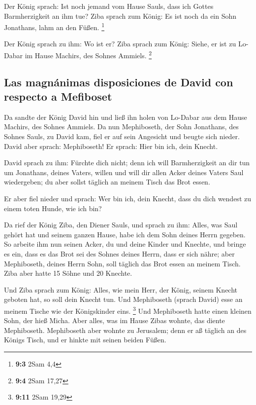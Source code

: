  Der König sprach: Ist noch jemand vom Hause Sauls, dass
ich Gottes Barmherzigkeit an ihm tue? Ziba sprach zum König: Es ist noch
da ein Sohn Jonathans, lahm an den Füßen. \footnote{\textbf{9:3} 2Sam
  4,4}

 Der König sprach zu ihm: Wo ist er? Ziba sprach zum
König: Siehe, er ist zu Lo-Dabar im Hause Machirs, des Sohnes Ammiels.
\footnote{\textbf{9:4} 2Sam 17,27}

\hypertarget{las-magnuxe1nimas-disposiciones-de-david-con-respecto-a-mefiboset}{%
\subsection{Las magnánimas disposiciones de David con respecto a
Mefiboset}\label{las-magnuxe1nimas-disposiciones-de-david-con-respecto-a-mefiboset}}

 Da sandte der König David hin und ließ ihn holen von
Lo-Dabar aus dem Hause Machirs, des Sohnes Ammiels.  Da
nun Mephiboseth, der Sohn Jonathans, des Sohnes Sauls, zu David kam,
fiel er auf sein Angesicht und beugte sich nieder. David aber sprach:
Mephiboseth! Er sprach: Hier bin ich, dein Knecht.

 David sprach zu ihm: Fürchte dich nicht; denn ich will
Barmherzigkeit an dir tun um Jonathans, deines Vaters, willen und will
dir allen Acker deines Vaters Saul wiedergeben; du aber sollst täglich
an meinem Tisch das Brot essen.

 Er aber fiel nieder und sprach: Wer bin ich, dein Knecht,
dass du dich wendest zu einem toten Hunde, wie ich bin?

 Da rief der König Ziba, den Diener Sauls, und sprach zu
ihm: Alles, was Saul gehört hat und seinem ganzen Hause, habe ich dem
Sohn deines Herrn gegeben.  So arbeite ihm nun seinen
Acker, du und deine Kinder und Knechte, und bringe es ein, dass es das
Brot sei des Sohnes deines Herrn, dass er sich nähre; aber Mephiboseth,
deines Herrn Sohn, soll täglich das Brot essen an meinem Tisch. Ziba
aber hatte 15 Söhne und 20 Knechte.

 Und Ziba sprach zum König: Alles, wie mein Herr, der
König, seinem Knecht geboten hat, so soll dein Knecht tun. Und
Mephiboseth (sprach David) esse an meinem Tische wie der Königskinder
eins. \footnote{\textbf{9:11} 2Sam 19,29}  Und
Mephiboseth hatte einen kleinen Sohn, der hieß Micha. Aber alles, was im
Hause Zibas wohnte, das diente Mephiboseth.  Mephiboseth
aber wohnte zu Jerusalem; denn er aß täglich an des Königs Tisch, und er
hinkte mit seinen beiden Füßen.

